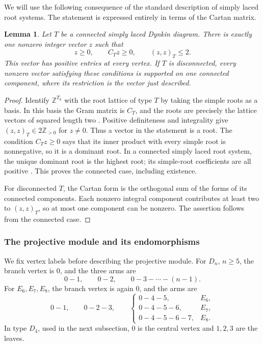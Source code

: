 \documentclass[a4paper,11pt,reqno]{amsart}
\newtheorem{lemma}[lemma]{Lemma}
\theoremstyle{definition}
\theoremstyle{plain}
\numberwithin{equation}{section}
\begin{document}
We will use the following consequence of the standard description
of simply laced root systems.  The statement is expressed entirely
in terms of the Cartan matrix.

\begin{lemma}
\label{lem:ade-cartan-uniqueness}
Let \(T\) be a connected simply laced Dynkin diagram.  There is
exactly one nonzero integer vector \(z\) such that
\[
 z\geq0,\qquad C_Tz\geq0,\qquad (z,z)_T\leq2.
\]
This vector has positive entries at every vertex.
If \(T\) is disconnected, every nonzero vector satisfying these
conditions is supported on one connected component, where its
restriction is the vector just described.
\end{lemma}

\begin{proof}
Identify \(\mathbb Z^{T_0}\) with the root lattice of type \(T\)
by taking the simple roots as a basis.  In this basis the Gram
matrix is \(C_T\), and the roots are precisely the lattice vectors
of squared length two
\cite[Chapter~VI, Section~4]{Bourbaki2002}.
Positive definiteness and integrality give
\((z,z)_T\in2\mathbb Z_{>0}\) for \(z\ne0\).
Thus a vector in the statement is a root.  The condition
\(C_Tz\geq0\) says that its inner product with every simple root
is nonnegative, so it is a dominant root.
In a connected simply laced root system, the unique dominant root
is the highest root; its simple-root coefficients are all positive
\cite[Chapter~VI, Section~1, no.~8]{Bourbaki2002}.
This proves the connected case, including existence.

For disconnected \(T\), the Cartan form is the orthogonal sum of
the forms of its connected components.  Each nonzero integral
component contributes at least two to \((z,z)_T\), so at most
one component can be nonzero.  The assertion follows from the
connected case.
\end{proof}

\subsubsection{The projective module and its endomorphisms}

We fix vertex labels before describing the projective module.
For \(D_n\), \(n\ge5\), the branch vertex is \(0\), and the
three arms are
\[
 0-1,\qquad 0-2,\qquad 0-3-\cdots-(n-1).
\]
For \(E_6,E_7,E_8\), the branch vertex is again \(0\), and the
arms are
\[
 0-1,\qquad 0-2-3,\qquad
 \begin{cases}
 0-4-5,&E_6,\\
 0-4-5-6,&E_7,\\
 0-4-5-6-7,&E_8.
 \end{cases}
\]
In type \(D_4\), used in the next subsection, \(0\) is the
central vertex and \(1,2,3\) are the leaves.
\end{document}
